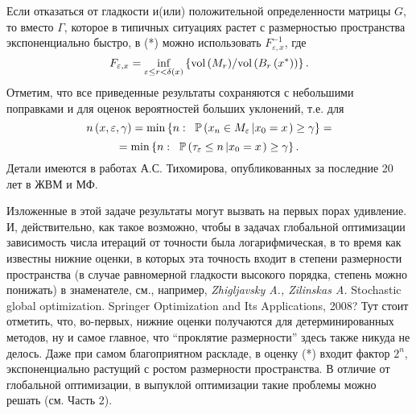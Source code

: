 \begin{remark}
Если отказаться от гладкости и(или) положительной 
определенности матрицы $G$, то вместо $\Gamma $, которое в типичных 
ситуациях растет с размерностью пространства экспоненциально быстро, в (*) 
можно использовать $F_{\varepsilon ,x}^{-1} $, где
\[
F_{\varepsilon ,x}  = \mathop {\inf }\limits_{\varepsilon \le r<\delta 
\left( x \right)} \left\{ {{\mbox{vol}\left( {M_r } \right)} \mathord{\left/ 
{\vphantom {{\mbox{vol}\left( {M_r } \right)} {\mbox{vol}\left( {B_r \left( 
{x^\ast } \right)} \right)}}} \right. \kern-\nulldelimiterspace} 
{\mbox{vol}\left( {B_r \left( {x^\ast } \right)} \right)}} \right\}.
\]
Отметим, что все приведенные результаты сохраняются с небольшими поправками 
и для оценок вероятностей больших уклонений, т.е. для
\[
n\left( {x,\varepsilon ,\gamma } \right)=\min \left\{ {n:\;\;\mathrm{{\mathbb P}}\left( {x_n 
\in M_\varepsilon \left| {x_0 =x} \right.} \right)\ge \gamma } \right\}=
\]
\[=\min 
\left\{ {n:\;\;\mathrm{{\mathbb P}}\left( {\tau _\varepsilon \le n\left| {x_0 =x} \right.} 
\right)\ge \gamma } \right\}.
\]
Детали имеются в работах А.С. Тихомирова, опубликованных за последние 20 лет 
в ЖВМ и МФ. 

Изложенные в этой задаче результаты могут вызвать на первых порах удивление. 
И, действительно, как такое возможно, чтобы в задачах глобальной оптимизации 
зависимость числа итераций от точности была логарифмическая, в то время как 
известны нижние оценки, в которых эта точность входит в степени размерности 
пространства (в случае равномерной гладкости высокого порядка, степень можно 
понижать) в знаменателе, см., например, \textit{Zhigljavsky A., Zilinskas A.} Stochastic global optimization. 
Springer Optimization and Its Applications, 2008? Тут стоит отметить, что, 
во-первых, нижние оценки получаются для детерминированных методов, ну и 
самое главное, что ``проклятие размерности'' здесь также никуда не делось. 
Даже при самом благоприятном раскладе, в оценку (*) входит фактор $2^n$, 
экспоненциально растущий с ростом размерности пространства. В отличие от 
глобальной оптимизации, в выпуклой оптимизации такие проблемы можно решать (см. Часть 2).

\end{remark}

